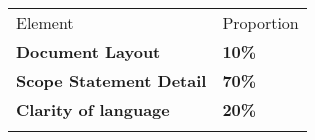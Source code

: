 \begin{table}[h!]
     \begin{center}
     \begin{tabular}{p{9cm}  p{3cm} }
     \toprule
      \textbf\large{Element} & \textbf\large{Proportion} \\ 
    \cmidrule(r){1-1}\cmidrule(lr){2-2}
      \textbf{Document Layout} & \textbf{10\%}\\
      \textbf{Scope Statement Detail} & \textbf{70\%}\\
      \textbf{Clarity of language} & \textbf{20\%}\\
      \\ \bottomrule
      \end{tabular}
      \label{tbl:markSchemeAsmt3}
      \end{center}
 \end{table}

